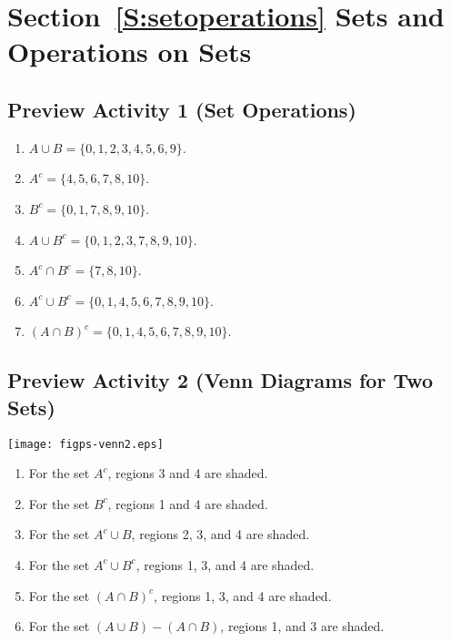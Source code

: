 \section*{Section~\ref{S:setoperations} Sets and Operations on Sets}

\subsection*{Preview Activity 1 (Set Operations)}
\begin{multicols}{2}
\begin{enumerate}
  \item $A \cup B = \{0, 1, 2, 3, 4, 5, 6, 9 \}$.
  \item $A^c = \{4, 5, 6, 7, 8, 10 \}$.
  \item $B^c = \{0, 1, 7, 8, 9, 10 \}$.
  \item $A \cup B^c = \{0, 1, 2, 3, 7, 8, 9, 10 \}$.
  \item $A^c \cap B^c = \{ 7, 8, 10 \}$.
  \item $A^c \cup B^c = \{0, 1, 4, 5, 6, 7, 8, 9, 10 \}$.
  \item $(A \cap B)^c = \{0, 1, 4, 5, 6, 7, 8, 9, 10 \}$.
\end{enumerate}
\end{multicols}
\hbreak



\subsection*{Preview Activity 2 (Venn Diagrams for Two Sets)}
\begin{center}
\texttt{[image: figps-venn2.eps]}
\end{center}

\begin{enumerate}
  \item For the set $A^c$, regions 3 and 4 are shaded.
  \item For the set $B^c$, regions 1 and 4 are shaded.
  \item For the set $A^c \cup B$, regions 2, 3, and 4 are shaded.
  \item For the set $A^c \cup B^c$, regions 1, 3, and 4 are shaded.
  \item For the set $(A \cap B)^c$, regions 1, 3, and 4 are shaded.
  \item For the set $(A \cup B) - (A \cap B)$, regions 1, and 3 are shaded.
\end{enumerate}
\hbreak


\newpage

\endinput
